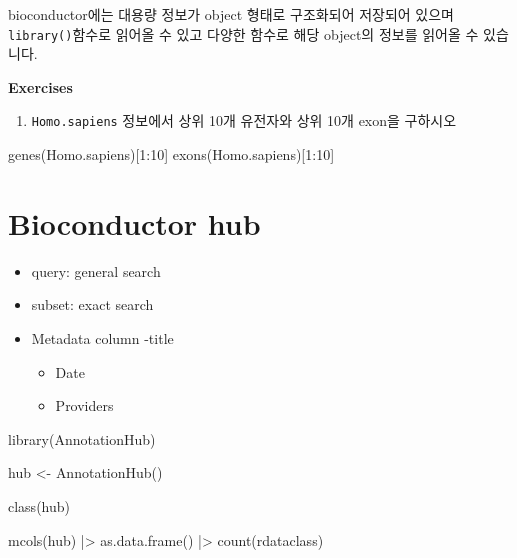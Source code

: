 \documentclass[
  a4paper,
]{book}
\newenvironment{Shaded}{\begin{snugshade}}{\end{snugshade}}
\newcommand{\DecValTok}[1]{\textcolor[rgb]{0.68,0.00,0.00}{#1}}
\newcommand{\FunctionTok}[1]{\textcolor[rgb]{0.28,0.35,0.67}{#1}}
\newcommand{\NormalTok}[1]{\textcolor[rgb]{0.00,0.23,0.31}{#1}}
\newcommand{\OtherTok}[1]{\textcolor[rgb]{0.00,0.23,0.31}{#1}}
\newcommand{\SpecialCharTok}[1]{\textcolor[rgb]{0.37,0.37,0.37}{#1}}
\providecommand{\tightlist}{%
  \setlength{\itemsep}{0pt}\setlength{\parskip}{0pt}}\usepackage{longtable,booktabs,array}
\begin{document}
bioconductor에는 대용량 정보가 object 형태로 구조화되어 저장되어 있으며
\texttt{library()}함수로 읽어올 수 있고 다양한 함수로 해당 object의
정보를 읽어올 수 있습니다.

\textbf{Exercises}

\begin{enumerate}
\def\labelenumi{\arabic{enumi})}
\tightlist
\item
  \texttt{Homo.sapiens} 정보에서 상위 10개 유전자와 상위 10개 exon을
  구하시오
\end{enumerate}

\begin{Shaded}
\begin{Highlighting}[]
\FunctionTok{genes}\NormalTok{(Homo.sapiens)[}\DecValTok{1}\SpecialCharTok{:}\DecValTok{10}\NormalTok{]}
\FunctionTok{exons}\NormalTok{(Homo.sapiens)[}\DecValTok{1}\SpecialCharTok{:}\DecValTok{10}\NormalTok{]}
\end{Highlighting}
\end{Shaded}

\hypertarget{bioconductor-hub}{%
\section{Bioconductor hub}\label{bioconductor-hub}}

\begin{itemize}
\item
  query: general search\\
\item
  subset: exact search
\item
  Metadata column -title

  \begin{itemize}
  \tightlist
  \item
    Date
  \item
    Providers
  \end{itemize}
\end{itemize}

\begin{Shaded}
\begin{Highlighting}[]
\FunctionTok{library}\NormalTok{(AnnotationHub)}

\NormalTok{hub }\OtherTok{\textless{}{-}} \FunctionTok{AnnotationHub}\NormalTok{()}

\FunctionTok{class}\NormalTok{(hub)}

\FunctionTok{mcols}\NormalTok{(hub) }\SpecialCharTok{|\textgreater{}} \FunctionTok{as.data.frame}\NormalTok{() }\SpecialCharTok{|\textgreater{}} \FunctionTok{count}\NormalTok{(rdataclass)}
\end{Highlighting}
\end{Shaded}
\end{document}
